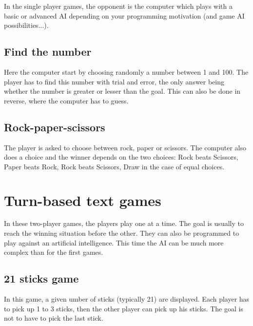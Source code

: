 \documentclass{ecnreport}
\begin{document}
In the single player games, the opponent is the computer which plays with a basic or advanced AI depending on your programming
motivation (and game AI possibilities...).


\subsection{Find the number}

Here the computer start by choosing randomly a number between 1 and 100. The player has to find this number with trial and error, the only answer being whether the number is greater or lesser than the goal.
This can also be done in reverse, where the computer has to guess.

\begin{itemize}
\end{itemize}

\subsection{Rock-paper-scissors}

The player is asked to choose between rock, paper or scissors. The computer also does a choice and the winner depends on the two choices: Rock beats Scissors, Paper beats Rock, Rock beats Scissors, Draw in the case of equal choices.

\begin{itemize}
\end{itemize}

\section{Turn-based text games}

In these two-player games, the players play one at a time. The goal is usually to reach the winning situation before the other.
They can also be programmed to play against an artificial intelligence. This time the AI can be much more complex than for the first games.

\subsection{21 sticks game}

In this game, a given umber of sticks (typically 21) are displayed.
Each player has to pick up 1 to 3 sticks, then the other player can pick up his sticks.
The goal is not to have to pick the last stick.
\end{document}
